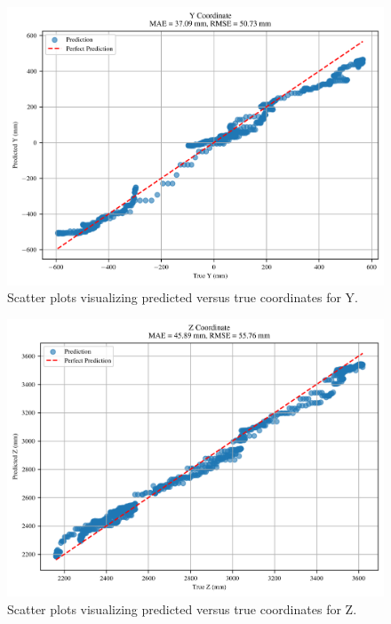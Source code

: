 \documentclass[]{spie}  %
\begin{document}
	\begin{figure}[H]
		\centering
		\includegraphics[width=6.5in]{figures/Figure5_Scatter_Y}
		\caption{Scatter plots visualizing predicted versus true coordinates for Y.}
		\label{fig:Figure5_Scatter_Y}
	\end{figure}
	
	\begin{figure}[H]
		\centering
		\includegraphics[width=6.5in]{figures/Figure5_Scatter_Z}
		\caption{Scatter plots visualizing predicted versus true coordinates for Z.}
		\label{fig:Figure5_Scatter_Z}
	\end{figure}
	
	\lipsum[1-2]
	
\end{document}
